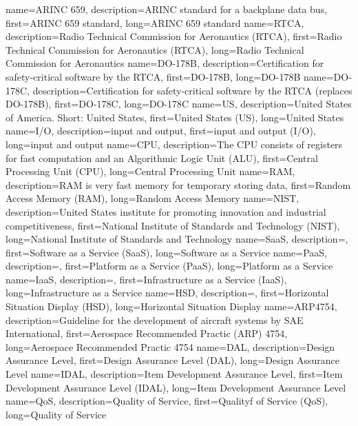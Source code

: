 {%
    name={ARINC 659},
    description={ARINC standard for a backplane data bus},
    first={ARINC 659 standard},
    long={ARINC 659 standard}
}
{%
    name={RTCA},
    description={Radio Technical Commission for Aeronautics (RTCA)},
    first={Radio Technical Commission for Aeronautics (RTCA)},
    long={Radio Technical Commission for Aeronautics}
}
{%
    name={DO-178B},
    description={Certification for safety-critical software by the RTCA},
    first={DO-178B},
    long={DO-178B}
}
{%
    name={DO-178C},
    description={Certification for safety-critical software by the RTCA (replaces DO-178B)},
    first={DO-178C},
    long={DO-178C}
}
{%
    name={US},
    description={United States of America. Short: United States},
    first={United States (US)},
    long={United States}
}
{%
    name={I/O},
    description={input and output},
    first={input and output (I/O)},
    long={input and output}
}
{%
    name={CPU},
    description={The CPU consists of registers for fast computation and an Algorithmic Logic Unit (ALU)},
    first={Central Processing Unit (CPU)},
    long={Central Processing Unit}
}
{%
    name={RAM},
    description={RAM is very fast memory for temporary storing data},
    first={Random Access Memory (RAM)},
    long={Random Access Memory}
}
{%
    name={NIST},
    description={United States institute for promoting innovation and industrial competitiveness},
    first={National Institute of Standards and Technology (NIST)},
    long={National Institute of Standards and Technology}
}
{%
    name={SaaS},
    description={},
    first={Software as a Service (SaaS)},
    long={Software as a Service}
}
{%
    name={PaaS},
    description={},
    first={Platform as a Service (PaaS)},
    long={Platform as a Service}
}
{%
    name={IaaS},
    description={},
    first={Infrastructure as a Service (IaaS)},
    long={Infrastructure as a Service}
}
{%
    name={HSD},
    description={},
    first={Horizontal Situation Display (HSD)},
    long={Horizontal Situation Display}
}
{%
    name={ARP4754},
    description={Guideline for the development of aircraft systems by SAE International},
    first={Aerospace Recommended Practic (ARP) 4754},
    long={Aerospace Recommended Practic 4754}
}
{%
    name={DAL},
    description={Design Assurance Level},
    first={Design Assurance Level (DAL)},
    long={Design Assurance Level}
}
{%
    name={IDAL},
    description={Item Development Assurance Level},
    first={Item Development Assurance Level (IDAL)},
    long={Item Development Assurance Level}
}
{%
    name={QoS},
    description={Quality of Service},
    first={Qualityf of Service (QoS)},
    long={Quality of Service}
}


